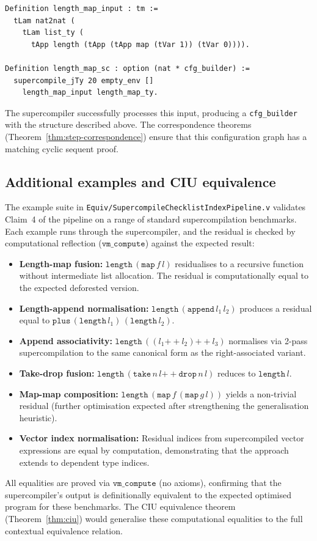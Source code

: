 \begin{verbatim}
Definition length_map_input : tm :=
  tLam nat2nat (
    tLam list_ty (
      tApp length (tApp (tApp map (tVar 1)) (tVar 0)))).

Definition length_map_sc : option (nat * cfg_builder) :=
  supercompile_jTy 20 empty_env [] 
    length_map_input length_map_ty.
\end{verbatim}

The supercompiler successfully processes this input, producing a \texttt{cfg\_builder} with the structure described above. The correspondence theorems (Theorem~\ref{thm:step-correspondence}) ensure that this configuration graph has a matching cyclic sequent proof.

\subsection{Additional examples and CIU equivalence}

The example suite in \texttt{Equiv/SupercompileChecklistIndexPipeline.v} validates Claim~4 of the pipeline on a range of standard supercompilation benchmarks.
Each example runs through the supercompiler, and the residual is checked by computational reflection ($\mathtt{vm\_compute}$) against the expected result:

\begin{itemize}[leftmargin=*]
\item \textbf{Length-map fusion:} $\mathtt{length}\,(\mathtt{map}\,f\,l)$ residualises to a recursive function without intermediate list allocation. The residual is computationally equal to the expected deforested version.
\item \textbf{Length-append normalisation:} $\mathtt{length}\,(\mathtt{append}\,l_1\,l_2)$ produces a residual equal to $\mathtt{plus}\,(\mathtt{length}\,l_1)\,(\mathtt{length}\,l_2)$.
\item \textbf{Append associativity:} $\mathtt{length}\,((l_1 \mathbin{++} l_2) \mathbin{++} l_3)$ normalises via 2-pass supercompilation to the same canonical form as the right-associated variant.
\item \textbf{Take-drop fusion:} $\mathtt{length}\,(\mathtt{take}\,n\,l \mathbin{++} \mathtt{drop}\,n\,l)$ reduces to $\mathtt{length}\,l$.
\item \textbf{Map-map composition:} $\mathtt{length}\,(\mathtt{map}\,f\,(\mathtt{map}\,g\,l))$ yields a non-trivial residual (further optimisation expected after strengthening the generalisation heuristic).
\item \textbf{Vector index normalisation:} Residual indices from supercompiled vector expressions are equal by computation, demonstrating that the approach extends to dependent type indices.
\end{itemize}

All equalities are proved via $\mathtt{vm\_compute}$ (no axioms), confirming that the supercompiler's output is definitionally equivalent to the expected optimised program for these benchmarks.
The CIU equivalence theorem (Theorem~\ref{thm:ciu}) would generalise these computational equalities to the full contextual equivalence relation.
